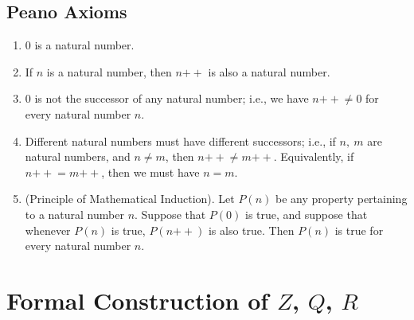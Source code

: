\documentclass{article}
\newcommand{\increment}{\mathbin{++}}
\begin{document}
\subsection{Peano Axioms}
\begin{enumerate}[label=3.1.\arabic*]
    \item 0 is a natural number.
    \item If $n$ is a natural number, then $n \increment$ is also a natural number.
    \item 0 is not the successor of any natural number; i.e., we have $n \increment \neq 0$ for every natural number $n$.
    \item Different natural numbers must have different successors; i.e., if $n,~m$ are natural numbers, and $n \neq m$, then $n\increment \neq m\increment$. Equivalently, if $n\increment = m\increment$, then we must have $n = m$.
    \item (Principle of Mathematical Induction). Let $P(n)$ be any property pertaining to a natural number $n$. Suppose that $P(0)$ is true, and suppose that whenever $P(n)$ is true, $P(n\increment)$ is also true. Then $P(n)$ is true for every natural number $n$.
\end{enumerate}

\section{Formal Construction of $Z$, $Q$, $R$}






\section{}
\end{document}

